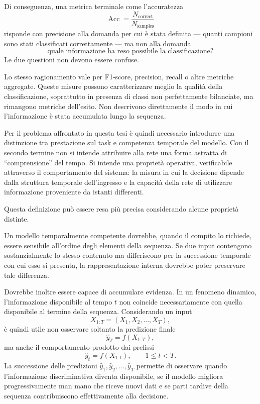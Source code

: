 Di conseguenza, una metrica terminale come l'accuratezza
\begin{equation}
\label{eq:accuratezza_terminale}
\operatorname{Acc} = \frac{N_{\mathrm{correct}}}{N_{\mathrm{samples}}}
\end{equation}
risponde con precisione alla domanda per cui è stata definita --- quanti campioni sono stati classificati correttamente --- ma non alla domanda
\begin{equation*}
\text{quale informazione ha reso possibile la classificazione?}
\end{equation*}
Le due questioni non devono essere confuse.

Lo stesso ragionamento vale per F1-score, precision, recall o altre metriche aggregate. Queste misure possono caratterizzare meglio la qualità della classificazione, soprattutto in presenza di classi non perfettamente bilanciate, ma rimangono metriche dell'esito. Non descrivono direttamente il modo in cui l'informazione è stata accumulata lungo la sequenza.

Per il problema affrontato in questa tesi è quindi necessario introdurre una distinzione tra prestazione sul task e competenza temporale del modello. Con il secondo termine non si intende attribuire alla rete una forma astratta di ``comprensione'' del tempo. Si intende una proprietà operativa, verificabile attraverso il comportamento del sistema: la misura in cui la decisione dipende dalla struttura temporale dell'ingresso e la capacità della rete di utilizzare informazione proveniente da istanti differenti.

Questa definizione può essere resa più precisa considerando alcune proprietà distinte.

Un modello temporalmente competente dovrebbe, quando il compito lo richiede, essere sensibile all'ordine degli elementi della sequenza. Se due input contengono sostanzialmente lo stesso contenuto ma differiscono per la successione temporale con cui esso si presenta, la rappresentazione interna dovrebbe poter preservare tale differenza.

Dovrebbe inoltre essere capace di accumulare evidenza. In un fenomeno dinamico, l'informazione disponibile al tempo $t$ non coincide necessariamente con quella disponibile al termine della sequenza. Considerando un input
\begin{equation*}
X_{1:T} = (X_1, X_2, \dots, X_T),
\end{equation*}
è quindi utile non osservare soltanto la predizione finale
\begin{equation*}
\hat{y}_T = f(X_{1:T}),
\end{equation*}
ma anche il comportamento prodotto dai prefissi
\begin{equation}
\label{eq:predizioni_prefissi}
\hat{y}_t = f(X_{1:t}), \qquad 1 \leq t < T.
\end{equation}
La successione delle predizioni $\hat{y}_1, \hat{y}_2, \dots, \hat{y}_T$ permette di osservare quando l'informazione discriminativa diventa disponibile, se il modello migliora progressivamente man mano che riceve nuovi dati e se parti tardive della sequenza contribuiscono effettivamente alla decisione.

